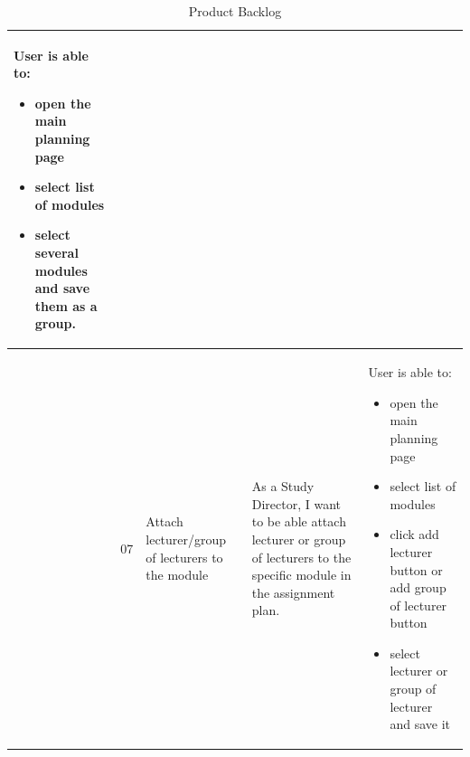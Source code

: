 \documentclass{scrartcl}
\begin{document}
\begin{table}[H]
\begin{center}
\begin{tabular}{|p{4cm}|p{0.5cm} |p{3cm}|p{4cm}|p{4cm}|}
   User is able to:            
\begin{itemize}
\item open the main planning page
\item select list of modules
\item select several modules and save them as a group.
\end{itemize}       \\ \hline

 &
 07&
 Attach lecturer/group of lecturers to the module&
 As a Study Director, I want to be able attach lecturer or group of lecturers to the specific module in the assignment plan. &
 
   User is able to:            
\begin{itemize}
\item open the main planning page
\item select list of modules 
\item click add lecturer button or add group of lecturer button
\item select lecturer or group of lecturer and save it


\end{itemize}                                                             

  
\end{tabular}
\end{center}
\caption{Product Backlog}
\label{table2}
\end{table}

\pagebreak                                                            
\end{document}
